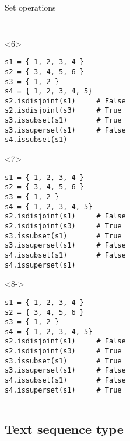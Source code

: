 \begin{frame}[fragile]{Set operations}
\begin{columns}[onlytextwidth]
\begin{column}{\textwidth}
\begin{onlyenv}
\begin{lstlisting}[style=python,morekeywords={for, in, range, list}]
 \end{lstlisting}
      \end{onlyenv}

      \begin{onlyenv}<6>
        \begin{lstlisting}[style=python,morekeywords={for, in, range, list}]
s1 = { 1, 2, 3, 4 }
s2 = { 3, 4, 5, 6 }
s3 = { 1, 2 }
s4 = { 1, 2, 3, 4, 5}
s2.isdisjoint(s1)     # False
s2.isdisjoint(s3)     # True
s3.issubset(s1)       # True
s3.issuperset(s1)     # False
s4.issubset(s1)
 \end{lstlisting}
      \end{onlyenv}

      \begin{onlyenv}<7>
        \begin{lstlisting}[style=python,morekeywords={for, in, range, list}]
s1 = { 1, 2, 3, 4 }
s2 = { 3, 4, 5, 6 }
s3 = { 1, 2 }
s4 = { 1, 2, 3, 4, 5}
s2.isdisjoint(s1)     # False
s2.isdisjoint(s3)     # True
s3.issubset(s1)       # True
s3.issuperset(s1)     # False
s4.issubset(s1)       # False
s4.issuperset(s1)\end{lstlisting}
      \end{onlyenv}

      \begin{onlyenv}<8->
        \begin{lstlisting}[style=python,morekeywords={for, in, range, list}]
s1 = { 1, 2, 3, 4 }
s2 = { 3, 4, 5, 6 }
s3 = { 1, 2 }
s4 = { 1, 2, 3, 4, 5}
s2.isdisjoint(s1)     # False
s2.isdisjoint(s3)     # True
s3.issubset(s1)       # True
s3.issuperset(s1)     # False
s4.issubset(s1)       # False
s4.issuperset(s1)     # True \end{lstlisting}
      \end{onlyenv}

    \end{column}
  \end{columns}

\end{frame}


\subsection{Text sequence type}

